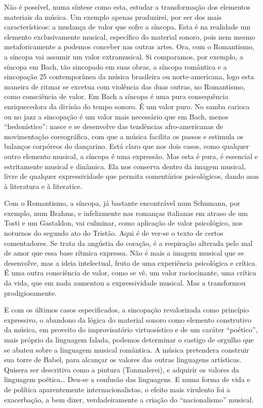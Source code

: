 Não é possível, numa síntese como esta, estudar a transformação dos
elementos materiais da música. Um exemplo apenas produzirei, por ser dos
mais característicos: a mudança de valor que sofre a síncopa. Esta é na
realidade um elemento exclusivamente musical, específico do material
sonoro, pois nem mesmo metaforicamente a podemos conceber nas outras
artes. Ora, com o Romantismo, a síncopa vai assumir um valor
extramusical. Si comparamos, por exemplo, a síncopa em Bach, tão
sincopado em suas obras, a síncopa romântica e a sincopação 25
contemporânea da música brasileira ou norte-americana, logo esta maneira
de ritmar se excetua com violência das duas outras, no Romantismo, como
consciência de valor. Em Bach a síncopa é uma pura consequência
enriquecedora da divisão do tempo sonoro. É um valor puro. No samba
carioca ou no jazz a sincopação é um valor mais necessário que em Bach,
menos ``hedonístico'': nasce e se desenvolve das tendências
afro-americanas de movimentação coreográfica, com que a música facilita
os passos e estimula os balanços corpóreos do dançarino. Está claro que
nos dois casos, como qualquer outro elemento musical, a síncopa é uma
expressão. Mas esta é pura, é essencial e estritamente musical e
dinâmica. Ela nos conserva dentro da imagem musical, livre de qualquer
expressividade que permita comentários psicológicos, dando asas à
literatura e à literatice.

Com o Romantismo, a síncopa, já bastante encontrável num Schumann, por
exemplo, num Brahms, e infelizmente nas romanças italianas em atraso de
um Tosti e um Gastaldon, vai culminar, como aplicação de valor
psicológico, nos noturnos do segundo ato do Tristão. Aqui é de ver-se o
texto de certos comentadores. Se trata da angústia do coração, é a
respiração alterada pelo mal de amor que essa base rítmica expressa. Não
é mais a imagem musical que se desenvolve, mas a ideia intelectual,
fruto de uma experiência psicológica e crítica. É uma outra consciência
de valor, como se vê, um valor raciocinante, uma crítica da vida, que em
nada aumentou a expressividade musical. Mas a transformou
prodigiosamente.

E com os últimos casos especificados, a sincopação revalorizada como
princípio expressivo, o abandono da lógica do material sonoro como
elemento construtivo da música, em proveito do improvisatório
virtuosístico e de um caráter ``poético'', mais próprio da linguagem
falada, podemos determinar o castigo de orgulho que se abateu sobre a
linguagem musical romântica. A música pretendera construir sua torre de
Babel, para alcançar os valores das outras linguagens artísticas.
Quisera ser descritiva como a pintura (Tonmalerei), e adquirir os
valores da linguagem poética\ldots{} Deu-se a confusão das linguagens. E numa
forma de vida e de política aparentemente internacionalistas, o efeito
mais virulento foi a exacerbação, a bem dizer, verdadeiramente a criação
do ``nacionalismo'' musical.

